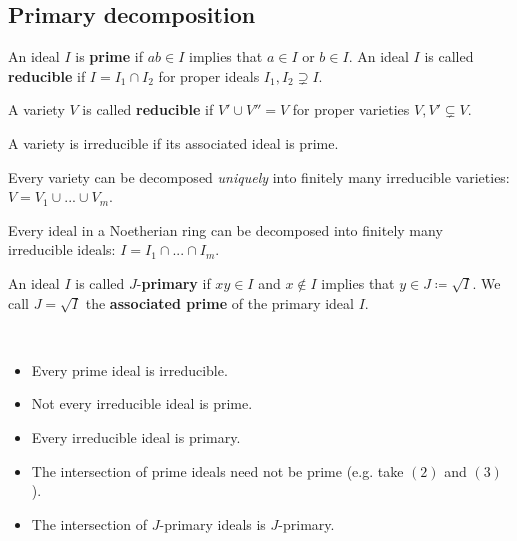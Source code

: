 \subsection{Primary decomposition}

\begin{defi}
  An ideal \( I \) is \textbf{prime} if \( ab \in I \) implies that \( a \in I \) or \( b \in I \). An ideal \( I \) is called \textbf{reducible} if \( I = I_1 \cap I_2 \) for proper ideals \( I_1 , I_2 \supsetneq I  \).
\end{defi}

\begin{defi}
  A variety \( V \) is called \textbf{reducible} if \( V' \cup V'' = V \) for proper varieties \( V, V' \subsetneq V \).
\end{defi}

\begin{prop}
  A variety is irreducible if its associated ideal is prime.
\end{prop}


\begin{prop}
  Every variety can be decomposed \emph{uniquely} into finitely many irreducible varieties: \( V = V_1 \cup ... \cup V_m \).
\end{prop}


\begin{prop}
  Every ideal in a Noetherian ring can be decomposed into finitely many irreducible ideals: \( I = I_1 \cap ... \cap I_m \).
\end{prop}

\begin{defi}
  An ideal \( I \) is called \( J \)-\textbf{primary} if \( xy \in I \) and \( x \notin I \) implies that \( y \in J \coloneqq \sqrt{I} \). We call \( J = \sqrt I \) the \textbf{associated prime} of the primary ideal \( I \).
\end{defi}


\begin{prop}\(  \)
  \begin{itemize}
    \item Every prime ideal is irreducible.
    \item Not every irreducible ideal is prime.
    \item Every irreducible ideal is primary.
    \item The intersection of prime ideals need not be prime (e.g. take \( (2) \) and \( (3) \)).
    \item The intersection of \(J\)-primary ideals is \( J \)-primary.
  \end{itemize}
\end{prop}

